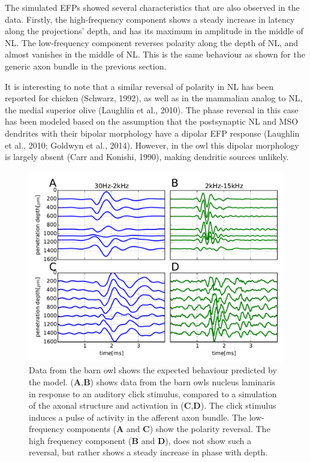 \documentclass[]{article}
\begin{document}
The simulated EFPs showed several characteristics that are also observed
in the data. Firstly, the high-frequency component shows a steady
increase in latency along the projections' depth, and has its maximum in
amplitude in the middle of NL. The low-frequency component reverses
polarity along the depth of NL, and almost vanishes in the middle of NL.
This is the same behaviour as shown for the generic axon bundle in the
previous section.

It is interesting to note that a similar reversal of polarity in NL has
been reported for chicken (Schwarz, 1992), as well as in the mammalian
analog to NL, the medial superior olive (Laughlin et al., 2010). The
phase reversal in this case has been modeled based on the assumption
that the postsynaptic NL and MSO dendrites with their bipolar morphology
have a dipolar EFP response (Laughlin et al., 2010; Goldwyn et al.,
2014). However, in the owl this dipolar morphology is largely absent
(Carr and Konishi, 1990), making dendritic sources unlikely.

\begin{figure}[htbp]
\centering
\includegraphics{../figs/fig_4.pdf}
\caption{\label{fig:barnowl}Data from the barn owl shows the expected
behaviour predicted by the model. (\textbf{A},\textbf{B}) shows data
from the barn owls nucleus laminaris in response to an auditory click
stimulus, compared to a simulation of the axonal structure and
activation in (\textbf{C},\textbf{D}). The click stimulus induces a
pulse of activity in the afferent axon bundle. The low-frequency
components (\textbf{A} and \textbf{C}) show the polarity reversal. The
high frequency component (\textbf{B} and \textbf{D}), does not show such
a reversal, but rather shows a steady increase in phase with depth.}
\end{figure}
\end{document}
